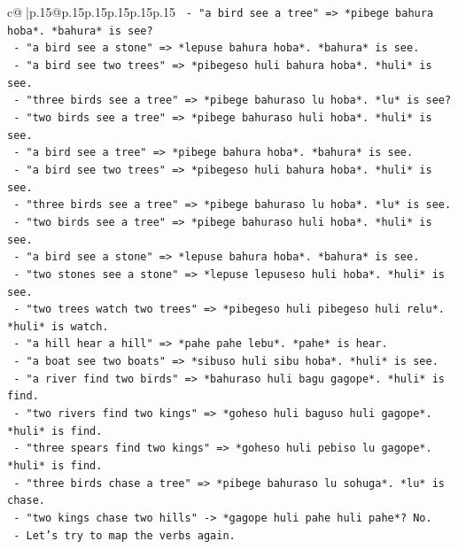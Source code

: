 \documentclass{article}
\begin{document}
{\begin{supertabular}{c@{$\;$}|p{.15\linewidth}@{}p{.15\linewidth}p{.15\linewidth}p{.15\linewidth}p{.15\linewidth}p{.15\linewidth}}
{{{\texttt{          {-} "a bird see a tree" => *pibege bahura hoba*. *bahura* is see?} \\
\texttt{          {-} "a bird see a stone" => *lepuse bahura hoba*. *bahura* is see.} \\
\texttt{          {-} "a bird see two trees" => *pibegeso huli bahura hoba*. *huli* is see.} \\
\texttt{          {-} "three birds see a tree" => *pibege bahuraso lu hoba*. *lu* is see?} \\
\texttt{          {-} "two birds see a tree" => *pibege bahuraso huli hoba*. *huli* is see.} \\
\texttt{          {-} "a bird see a tree" => *pibege bahura hoba*. *bahura* is see.} \\
\texttt{          {-} "a bird see two trees" => *pibegeso huli bahura hoba*. *huli* is see.} \\
\texttt{          {-} "three birds see a tree" => *pibege bahuraso lu hoba*. *lu* is see.} \\
\texttt{          {-} "two birds see a tree" => *pibege bahuraso huli hoba*. *huli* is see.} \\
\texttt{          {-} "a bird see a stone" => *lepuse bahura hoba*. *bahura* is see.} \\
\texttt{          {-} "two stones see a stone" => *lepuse lepuseso huli hoba*. *huli* is see.} \\
\texttt{          {-} "two trees watch two trees" => *pibegeso huli pibegeso huli relu*. *huli* is watch.} \\
\texttt{          {-} "a hill hear a hill" => *pahe pahe lebu*. *pahe* is hear.} \\
\texttt{          {-} "a boat see two boats" => *sibuso huli sibu hoba*. *huli* is see.} \\
\texttt{          {-} "a river find two birds" => *bahuraso huli bagu gagope*. *huli* is find.} \\
\texttt{          {-} "two rivers find two kings" => *goheso huli baguso huli gagope*. *huli* is find.} \\
\texttt{          {-} "three spears find two kings" => *goheso huli pebiso lu gagope*. *huli* is find.} \\
\texttt{          {-} "three birds chase a tree" => *pibege bahuraso lu sohuga*. *lu* is chase.} \\
\texttt{          {-} "two kings chase two hills" {-}> *gagope huli pahe huli pahe*? No.} \\
\texttt{          {-} Let's try to map the verbs again.} \\
}}}
\end{supertabular}}
\end{document}
